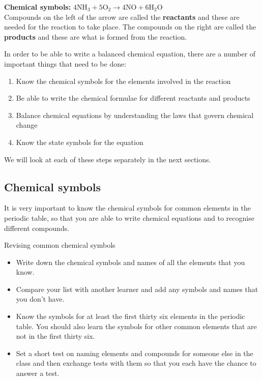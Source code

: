 \textbf{Chemical symbols:} $4{\text{NH}}_{3} + 5{\text{O}}_{2} \to 4\text{NO} + 6{\text{H}}_{2}\text{O}$\\ \newline
      \label{m38721*id62659}Compounds on the left of the arrow are called the \textbf{reactants} and these are needed for the reaction to take place. The compounds on the right are called the \textbf{products} and these are what is formed from the reaction.\par 
      \label{m38721*id62675}In order to be able to write a balanced chemical equation, there are a number of important things that need to be done:\par 
      \label{m38721*id62681}\begin{enumerate}[noitemsep, label=\textbf{\arabic*}. ] 
            \label{m38721*uid1}\item Know the chemical symbols for the elements involved in the reaction
\label{m38721*uid2}\item Be able to write the chemical formulae for different reactants and products
\label{m38721*uid3}\item Balance chemical equations by understanding the laws that govern chemical change
\label{m38721*uid4}\item Know the state symbols for the equation
\end{enumerate}
      \label{m38721*id62733}We will look at each of these steps separately in the next sections.\par 
    \label{m38721*cid2}
            \subsection*{Chemical symbols}
            \nopagebreak
            
      \label{m38721*id62746}It is very important to know the chemical symbols for common elements in the periodic table, so that you are able to write chemical equations and to recognise different compounds. 
\label{m38721*secfhsst!!!underscore!!!id109}
\vspace{1cm}
            \begin{activity}{Revising common chemical symbols }
            \nopagebreak
      \label{m38721*id62763}\begin{itemize}[noitemsep]
            \label{m38721*uid5}\item Write down the chemical symbols and names of all the elements that you know.
\label{m38721*uid6}\item Compare your list with another learner and add any symbols and names that you don't have.
\label{m38721*uid7}\item Know the symbols for at least the first thirty six elements in the periodic table. You should also learn the symbols for other common elements that are not in the first thirty six.
\label{m38721*uid8}\item Set a short test on naming elements and compounds for someone else in the class and then exchange tests with them so that you each have the chance to answer a test.
\end{itemize}
\end{activity}
    \label{m38721*cid3}
